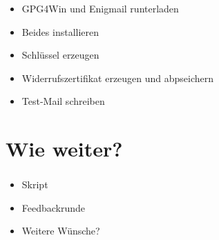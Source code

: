 \documentclass[compress]{beamer}
\begin{document}
\begin{frame}
  \frametitle{\insertsection}
  \begin{itemize}
  \item GPG4Win und Enigmail runterladen
  \item Beides installieren
  \item Schlüssel erzeugen
  \item Widerrufszertifikat erzeugen und abpseichern
  \item Test-Mail schreiben
  \end{itemize}
\end{frame}

\section{Wie weiter?}
\label{sec:weiter}

\begin{frame}
  \frametitle{\insertsection}
  \begin{itemize}
  \item Skript
  \item Feedbackrunde
  \item Weitere Wünsche?
  \end{itemize}
\end{frame}
\end{document}
